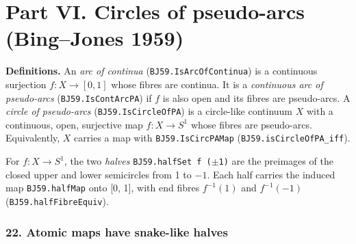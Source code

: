 \documentclass[11pt]{article}
\newcommand{\lean}[1]{\texttt{#1}}
\begin{document}
\bigskip

\part*{Part VI. Circles of pseudo-arcs (Bing--Jones 1959)}

\textbf{Definitions.} An \emph{arc of continua} (\lean{BJ59.\hspace{0pt}IsArcOfContinua}) is a continuous surjection $f : X \to [0, 1]$ whose fibres are continua. It is a \emph{continuous arc of pseudo-arcs} (\lean{BJ59.\hspace{0pt}IsContArcPA}) if $f$ is also open and its fibres are pseudo-arcs. A \emph{circle of pseudo-arcs} (\lean{BJ59.\hspace{0pt}IsCircleOfPA}) is a circle-like continuum $X$ with a continuous, open, surjective map $f : X \to S^1$ whose fibres are pseudo-arcs. Equivalently, $X$ carries a map with \lean{BJ59.\hspace{0pt}IsCircPAMap} (\lean{BJ59.\hspace{0pt}isCircleOfPA\_\hspace{0pt}iff}).

For $f : X \to S^1$, the two \emph{halves} \lean{BJ59.\hspace{0pt}halfSet f ($\pm$1)} are the preimages of the closed upper and lower semicircles from 1 to $-1$. Each half carries the induced map \lean{BJ59.\hspace{0pt}halfMap} onto [0, 1], with end fibres $f^{-1}(1)$ and $f^{-1}(-1)$ (\lean{BJ59.\hspace{0pt}halfFibreEquiv}).

\section*{22. Atomic maps have snake-like halves}
\end{document}
